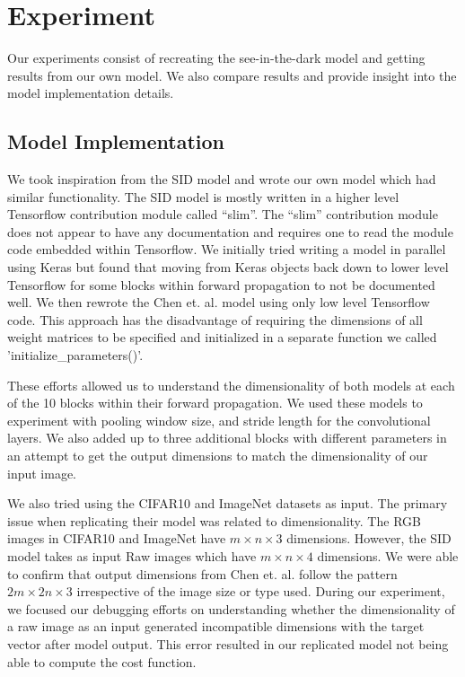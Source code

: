\documentclass{article}
\begin{document}
\section{Experiment}

Our experiments consist of recreating the see-in-the-dark model and
getting results from our own model. We also compare results and provide
insight into the model implementation details.

\subsection{Model Implementation}

We took inspiration from the SID model and wrote our own model which
had similar functionality. The SID model is mostly written in a higher
level Tensorflow contribution module called ``slim''. The ``slim''
contribution module does not appear to have any documentation and requires
one to read the module code embedded within Tensorflow. We initially tried
writing a model in parallel using Keras but found that moving from Keras
objects back down to lower level Tensorflow for some blocks within
forward propagation to not be documented well. We then rewrote the
Chen et. al. \cite{chen2018learning} model using only low level Tensorflow
code. This approach has the disadvantage of requiring the dimensions of
all weight matrices to be specified and initialized in a separate function
we called 'initialize\_parameters()'. \newline

These efforts allowed us to understand the dimensionality of both models at
each of the 10 blocks within their forward propagation. We used these
models to experiment with pooling window size, and stride
length for the convolutional layers. We also added up
to three additional blocks with different parameters in an attempt to
get the output dimensions to match the dimensionality of our input
image. \newline

We also tried using the CIFAR10 and ImageNet datasets as input. The primary
issue when replicating their model was related to dimensionality. The RGB
images in CIFAR10 and ImageNet have $m \times n \times 3$ dimensions.
However, the SID model takes as input Raw images which have
$m \times n \times 4$ dimensions. We were able to confirm that output
dimensions from Chen et. al. \cite{chen2018learning} follow the pattern
$2m \times 2n \times 3$ irrespective of the image size or type used. During
our experiment, we focused our debugging efforts on understanding whether
the dimensionality of a raw image as an input generated incompatible
dimensions with the target vector after model output. This error resulted
in our replicated model not being able to compute the cost function.\newline
\end{document}
